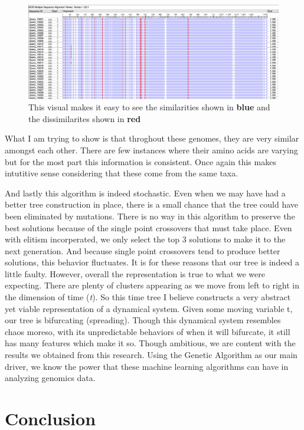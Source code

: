 \begin{figure}[H]
\centering
\includegraphics[width=.9\textwidth]{figures/sa1.png}
\caption{This visual makes it easy to see the similarities shown in \textbf{blue} and the dissimilarites shown in \textbf{red}}
\end{figure}

What I am trying to show is that throghout these genomes, they are very similar amongst each other. There are few instances where their amino acids are varying but for the most part this information is consistent. Once again this makes intutitive sense considering that these come from the same taxa. 

And lastly this algorithm is indeed stochastic. Even when we may have had a better tree construction in place, there is a small chance that the tree could have been eliminated by mutations. There is no way in this algorithm to preserve the best solutions because of the single point crossovers that must take place. Even with elitism incorperated, we only select the top 3 solutions to make it to the next generation. And because single point crossovers tend to produce better solutions, this behavior fluctuates. It is for these reasons that our tree is indeed a little faulty. However, overall the representation is true to what we were expecting. There are plenty of clusters appearing as we move from left to right in the dimension of time (\emph{t}). So this time tree I believe constructs a very abstract yet viable representation of a dynamical system. Given some moving variable t, our tree is bifurcating (spreading). Though this dynamical system resembles chaos moreso, with its unpredictable behaviors of when it will bifurcate, it still has many features which make it so. Though ambitious, we are content with the results we obtained from this research. Using the Genetic Algorithm as our main driver, we know the power that these machine learning algorithms can have in analyzing genomics data.  

\section{Conclusion}

